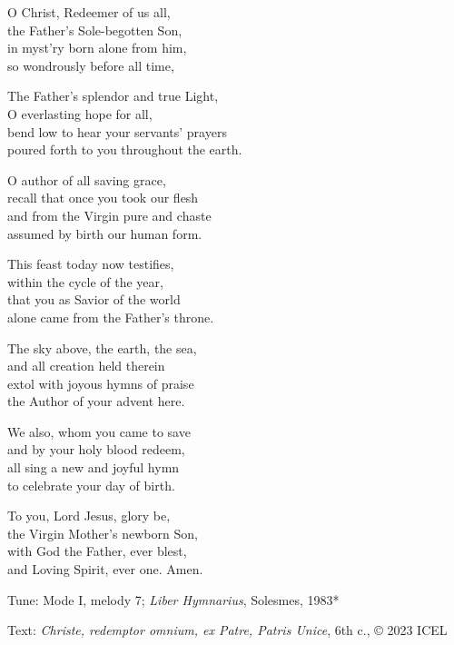 \hymn

\settowidth{\versewidth}{poured forth to you throughout the earth.}

\begin{hymnverse}%
O Christ, Redeemer of us all,\\
the Father’s Sole-begotten Son,\\
in myst’ry born alone from him,\\
so wondrously before all time,

The Father’s splendor and true Light,\\
O everlasting hope for all,\\
bend low to hear your servants’ prayers\\
poured forth to you throughout the earth.

O author of all saving grace,\\
recall that once you took our flesh\\
and from the Virgin pure and chaste\\
assumed by birth our human form.

This feast today now testifies,\\
within the cycle of the year,\\
that you as Savior of the world\\
alone came from the Father’s throne.

The sky above, the earth, the sea,\\
and all creation held therein\\
extol with joyous hymns of praise\\
the Author of your advent here.

We also, whom you came to save\\
and by your holy blood redeem,\\
all sing a new and joyful hymn\\
to celebrate your day of birth.

To you, Lord Jesus, glory be,\\
the Virgin Mother’s newborn Son,\\
with God the Father, ever blest,\\
and Loving Spirit, ever one. Amen.
\end{hymnverse}

\begin{hymnsource}
Tune: Mode I, melody 7; \emph{Liber Hymnarius}, Solesmes, 1983*

Text: \emph{Christe, redemptor omnium, ex Patre, Patris Unice}, 6th c., © 2023 ICEL
\end{hymnsource}